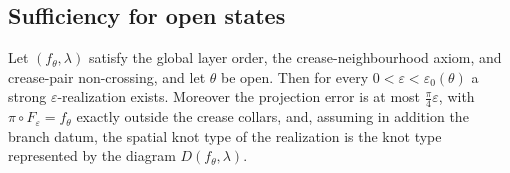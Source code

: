 \subsection{Sufficiency for open states}

\begin{theorem}\label{thm:openreal}
Let $(f_\theta,\lambda)$ satisfy the global layer order, the crease-neighbourhood axiom, and crease-pair non-crossing, and let $\theta$ be open. Then for every $0<\varepsilon<\varepsilon_0(\theta)$ a strong $\varepsilon$-realization exists. Moreover the projection error is at most $\frac\pi4\varepsilon$, with $\pi\circ F_\varepsilon=f_\theta$ exactly outside the crease collars, and, assuming in addition the branch datum, the spatial knot type of the realization is the knot type represented by the diagram $D(f_\theta,\lambda)$.
\end{theorem}

